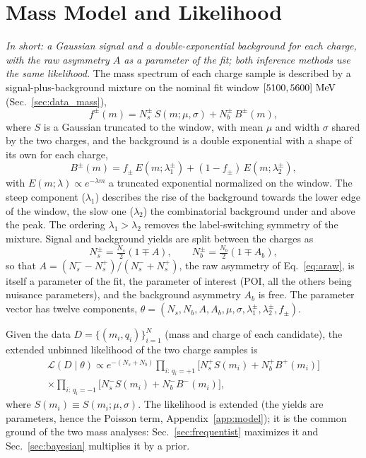 \section{Mass Model and Likelihood}
\label{sec:model}
\label{sec:bayes_model}
\emph{In short: a Gaussian signal and a double-exponential background for each charge, with the raw asymmetry $A$ as a parameter of the fit; both inference methods use the same likelihood.}
The mass spectrum of each charge sample is described by a signal-plus-background mixture on the nominal fit window $[5100,5600]\,\,\text{Me\hspace{-.08em}V}$ (Sec.~\ref{sec:data_mass}),
\begin{equation}
f^{\pm}(m)=N_s^{\pm}\,S(m;\mu,\sigma)+N_b^{\pm}\,B^{\pm}(m),
\label{eq:mixture}
\end{equation}
where $S$ is a Gaussian truncated to the window, with mean $\mu$ and width $\sigma$ shared by the two charges, and the background is a double exponential with a shape of its own for each charge,
\[
B^{\pm}(m)=f_{\pm}\,E(m;\lambda_{1}^{\pm})+(1-f_{\pm})\,E(m;\lambda_{2}^{\pm}),
\]
with $E(m;\lambda)\propto e^{-\lambda m}$ a truncated exponential normalized on the window. The steep component ($\lambda_1$) describes the rise of the background towards the lower edge of the window, the slow one ($\lambda_2$) the combinatorial background under and above the peak. The ordering $\lambda_1>\lambda_2$ removes the label-switching symmetry of the mixture. Signal and background yields are split between the charges as
\[
N_s^{\pm}=\tfrac{N_s}{2}(1\mp A),\qquad N_b^{\pm}=\tfrac{N_b}{2}(1\mp A_b),
\]
so that $A=(N_s^--N_s^+)/(N_s^-+N_s^+)$, the raw asymmetry \Araw of Eq.~\eqref{eq:araw}, is itself a parameter of the fit, the parameter of interest (POI, all the others being nuisance parameters), and the background asymmetry $A_b$ is free. The parameter vector has twelve components, $\theta=(N_s,N_b,A,A_b,\mu,\sigma,\lambda_1^{\pm},\lambda_2^{\pm},f_{\pm})$.

Given the data $D=\{(m_i,q_i)\}_{i=1}^{N}$ (mass and charge of each candidate), the extended unbinned likelihood of the two charge samples is
\begin{multline}
\mathcal{L}(D\mid\theta)\propto e^{-(N_s+N_b)}
\prod_{i:\,q_i=+1}\Big[N_s^{+}S(m_i)+N_b^{+}B^{+}(m_i)\Big] \\
\times\prod_{i:\,q_i=-1}\Big[N_s^{-}S(m_i)+N_b^{-}B^{-}(m_i)\Big],
\label{eq:likelihood}
\end{multline}
where $S(m_i)\equiv S(m_i;\mu,\sigma)$. The likelihood is extended (the yields are parameters, hence the Poisson term, Appendix~\ref{app:model}); it is the common ground of the two mass analyses: Sec.~\ref{sec:frequentist} maximizes it and Sec.~\ref{sec:bayesian} multiplies it by a prior.

